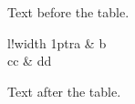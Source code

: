 \documentclass[12pt]{article}
\begin{document}
Text before the table.

\begin{tabular}{l!{\vrule width 1pt}r}a & b\\cc & dd\end{tabular}

Text after the table.
\end{document}
